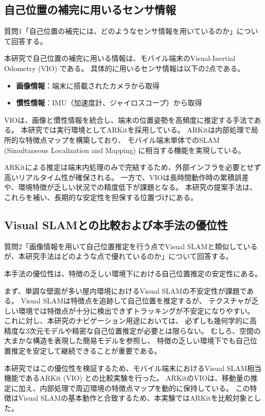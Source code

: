 \documentclass[]{jarticle}          %
\begin{document}
\subsection{自己位置の補完に用いるセンサ情報}
質問1「自己位置の補完には、どのようなセンサ情報を用いているのか」について回答する。

本研究で自己位置の補完に用いる情報は、モバイル端末のVisual-Inertial Odometry (VIO) である。
具体的に用いるセンサ情報は以下の2点である。

\begin{itemize}
  \item \textbf{画像情報}：端末に搭載されたカメラから取得
  \item \textbf{慣性情報}：IMU（加速度計、ジャイロスコープ）から取得
\end{itemize}

VIOは、画像と慣性情報を統合し、端末の位置姿勢を高頻度に推定する手法である。
本研究では実行環境としてARKitを採用している。
ARKitは内部処理で局所的な特徴点マップを構築しており、
モバイル端末単体でのSLAM (Simultaneous Localization and Mapping) に相当する機能を実現している。

ARKitによる推定は端末内処理のみで完結するため、外部インフラを必要とせず高いリアルタイム性が確保される。
一方で、VIOは長時間動作時の累積誤差や、環境特徴が乏しい状況での精度低下が課題となる\cite{AppleARKitWorldTracking}。
本研究の提案手法は、これらを補い、長期的な安定性を担保する位置づけにある。


\subsection{Visual SLAMとの比較および本手法の優位性}
質問2「画像情報を用いて自己位置推定を行う点でVisual SLAMと類似しているが、本研究手法はどのような点で優れているのか」について回答する。

本手法の優位性は、特徴の乏しい環境下における自己位置推定の安定性にある。

まず、単調な壁面が多い屋内環境におけるVisual SLAMの不安定性が課題である。
Visual SLAMは特徴点を追跡して自己位置を推定するが、
テクスチャが乏しい環境では特徴点が十分に検出できずトラッキングが不安定になりやすい。
これに対し、本研究のナビゲーション用途においては、
必ずしも幾何学的に高精度な3次元モデルや精密な自己位置推定が必要とは限らない。
むしろ、空間の大まかな構造を表現した簡易モデルを参照し、
特徴の乏しい環境下でも自己位置推定を安定して継続できることが重要である。

本研究ではこの優位性を検証するため、モバイル端末におけるVisual SLAM相当機能であるARKit (VIO) との比較実験を行った。
ARKitのVIOは、移動量の推定に加え、内部処理で周辺環境の特徴点マップを動的に保持している。
この特徴はVisual SLAMの基本動作と合致するため、本実験ではARKitを比較対象とした。
\end{document}
